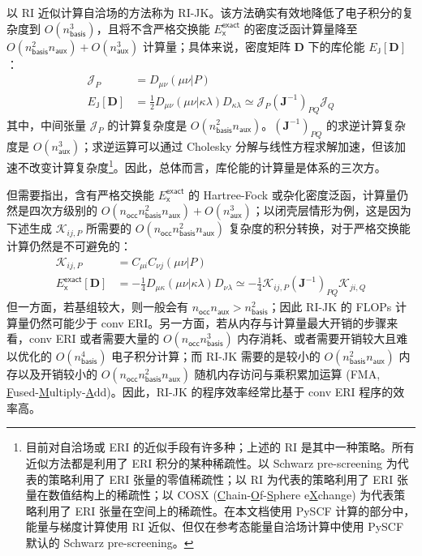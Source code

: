 以 RI 近似计算自洽场的方法称为 RI-JK。该方法确实有效地降低了电子积分的复杂度到 $O(n_\textsf{basis}^3)$，且将不含严格交换能 $E_\textsf{x}^\textsf{exact}$ 的密度泛函计算量降至 $O(n_\textsf{basis}^2 n_\textsf{aux}) + O(n_\textsf{aux}^3)$ 计算量；具体来说，密度矩阵 $\mathbf{D}$ 下的库伦能 $E_\textsf{J} [\mathbf{D}]$：
\begin{align*}
  \mathcal{J}_P &= D_{\mu \nu} (\mu \nu | P) \\
  E_\textsf{J} [\mathbf{D}] &= \frac{1}{2} D_{\mu \nu} (\mu \nu | \kappa \lambda) D_{\kappa \lambda} \simeq \mathcal{J}_P (\mathbf{J}^{-1})_{PQ} \mathcal{J}_Q
\end{align*}
其中，中间张量 $\mathcal{J}_P$ 的计算复杂度是 $O(n_\textsf{basis}^2 n_\textsf{aux})$。$(\mathbf{J}^{-1})_{PQ}$ 的求逆计算复杂度是 $O(n_\textsf{aux}^3)$；求逆运算可以通过 Cholesky 分解与线性方程求解加速，但该加速不改变计算复杂度\footnote{目前对自洽场或 ERI 的近似手段有许多种；上述的 RI 是其中一种策略。所有近似方法都是利用了 ERI 积分的某种稀疏性。以 Schwarz pre-screening 为代表的策略利用了 ERI 张量的零值稀疏性\cite{Horn-Ahlrichs.JCC.1991}；以 RI 为代表的策略利用了 ERI 张量在数值结构上的稀疏性\cite{Vahtras-Feyereisen.CPL.1993}；以 COSX (\underline{C}hain-\underline{O}f-\underline{S}phere e\underline{X}change) 为代表策略利用了 ERI 张量在空间上的稀疏性\cite{Neese-Becker.CP.2009}。在本文档使用 PySCF 计算的部分中，能量与梯度计算使用 RI 近似、但仅在参考态能量自洽场计算中使用 PySCF 默认的 Schwarz pre-screening。}。因此，总体而言，库伦能的计算量是体系的三次方。

但需要指出，含有严格交换能 $E_\textsf{x}^\textsf{exact}$ 的 Hartree-Fock 或杂化密度泛函，计算量仍然是四次方级别的 $O(n_\textsf{occ} n_\textsf{basis}^2 n_\textsf{aux}) + O(n_\textsf{aux}^3)$；以闭壳层情形为例，这是因为下述生成 $\mathcal{K}_{ij, P}$ 所需要的 $O(n_\textsf{occ} n_\textsf{basis}^2 n_\textsf{aux})$ 复杂度的积分转换，对于严格交换能计算仍然是不可避免的：
\begin{align*}
  \mathcal{K}_{ij, P} &= C_{\mu i} C_{\nu j} (\mu \nu | P) \\
  E_\textsf{x}^\textsf{exact} [\mathbf{D}] &= - \frac{1}{4} D_{\mu \kappa} (\mu \nu | \kappa \lambda) D_{\nu \lambda} \simeq - \frac{1}{4} \mathcal{K}_{ij, P} (\mathbf{J}^{-1})_{PQ} \mathcal{K}_{ji, Q}
\end{align*}
但一方面，若基组较大，则一般会有 $n_\textsf{occ} n_\textsf{aux} > n_\textsf{basis}^2$；因此 RI-JK 的 FLOPs 计算量仍然可能少于 conv ERI。另一方面，若从内存与计算量最大开销的步骤来看，conv ERI 或者需要大量的 $O(n_\textsf{occ} n_\textsf{basis}^3)$ 内存消耗、或者需要开销较大且难以优化的 $O(n_\textsf{basis}^4)$ 电子积分计算；而 RI-JK 需要的是较小的 $O(n_\textsf{basis}^2 n_\textsf{aux})$ 内存以及开销较小的 $O(n_\textsf{occ} n_\textsf{basis}^2 n_\textsf{aux})$ 随机内存访问与乘积累加运算 (FMA, \underline{F}used-\underline{M}ultiply-\underline{A}dd)。因此，RI-JK 的程序效率经常比基于 conv ERI 程序的效率高。

